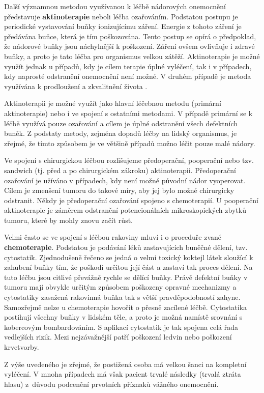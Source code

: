 Další významnou metodou využívanou k léčbě nádorových onemocnění představuje
\textbf{aktinoterapie} neboli léčba ozařováním. Podstatou postupu je
periodické vystavování buňky ionizujícímu záření. Energie z tohoto záření je
předávána buňce, která je tím poškozována. Tento postup se opírá o předpoklad,
že nádorové buňky jsou náchylnější k poškození. Záření ovšem ovlivňuje i
zdravé buňky, a proto je tato léčba pro organismus velkou zátěží.
Aktinoterapie je možné využít jednak u případů, kdy je cílem terapie úplné
vyléčení, tak i v případech, kdy naprosté odstranění onemocnění není možné. V
druhém případě je metoda využívána k prodloužení a zkvalitnění života
\cite{Slavicek2000}.

Aktinoterapii je možné využít jako hlavní léčebnou metodu (primární
aktinoterapie) nebo i ve spojení s ostatními metodami. V případě primární se k
léčbě využívá pouze ozařování a cílem je úplné odstranění všech defektních
buněk. Z podstaty metody, zejména dopadů léčby na lidský organismus, je
zřejmé, že tímto způsobem je ve většině případů možno léčit pouze malé nádory.

Ve spojení s chirurgickou léčbou rozlišujeme předoperační, pooperační nebo
tzv. sandwich (tj. před a po chirurgickém zákroku) aktinoterapii. Předoperační
ozařování je užíváno v případech, kdy není možné původní nádor vyoperovat.
Cílem je zmenšení tumoru do takové míry, aby jej bylo možné chirurgicky
odstranit. Někdy je předoperační ozařování spojeno s chemoterapií.
U pooperační aktinoterapie je záměrem odstranění potencionálních
mikroskopických zbytků tumoru, které by mohly znovu začít růst.

Velmi často se ve spojení s léčbou rakoviny mluví i o proceduře zvané
\textbf{chemoterapie}. Podstatou je podávání léků zastavujících buněčné
dělení, tzv. cytostatik. Zjednodušeně řečeno se jedná o velmi toxický koktejl
látek sloužící k zahubení buňky tím, že poškodí určitou její část a zastaví
tak proces dělení. Na tuto léčbu jsou citlivé převážně rychle se dělící buňky.
Právě defektní buňky v tumoru mají obvykle určitým způsobem poškozeny opravné
mechanizmy a cytostatiky zasažená rakovinná buňka tak s větší pravděpodobností
zahyne. Samozřejmě nelze u chemoterapie hovořit o přesně zacílené léčbě.
Cytostatika postihují všechny buňky v lidském těle, a proto je možná namístě
srovnání s kobercovým bombardováním. S aplikací cytostatik je tak
spojena celá řada vedlejších rizik. Mezi nejzávažnější patří poškození ledvin
nebo poškození krvetvorby.


Z výše uvedeného je zřejmé, že postižená osoba má velkou šanci na kompletní
vyléčení. V mnoha případech má však pacient trvalé následky (trvalá ztráta
hlasu) z~důvodu podcenění prvotních příznaků vážného onemocnění.


